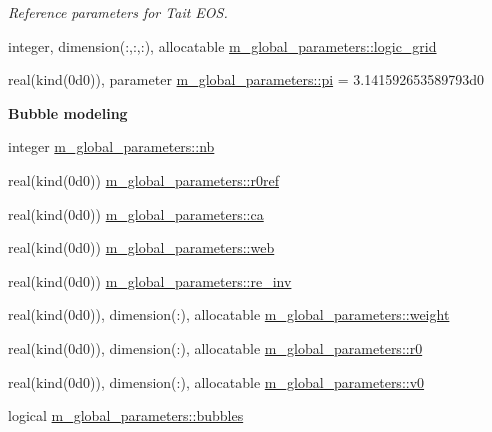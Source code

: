 \begin{DoxyCompactItemize}
\begin{DoxyCompactList}\small\item\em Reference parameters for Tait E\+OS. \end{DoxyCompactList}\item 
integer, dimension(\+:,\+:,\+:), allocatable \hyperlink{namespacem__global__parameters_adfaf902b37292b91750274e26989e8e6}{m\+\_\+global\+\_\+parameters\+::logic\+\_\+grid}
\item 
real(kind(0d0)), parameter \hyperlink{namespacem__global__parameters_a21765a90c01d221524670d1344b126cd}{m\+\_\+global\+\_\+parameters\+::pi} = 3.\+141592653589793d0
\end{DoxyCompactItemize}
\begin{Indent}\textbf{ Bubble modeling}\par
\begin{DoxyCompactItemize}
\item 
integer \hyperlink{namespacem__global__parameters_ad76c4758994b52559f478d251dc0cba5}{m\+\_\+global\+\_\+parameters\+::nb}
\item 
real(kind(0d0)) \hyperlink{namespacem__global__parameters_a24492f9b474683476a342e7ee42c1c6d}{m\+\_\+global\+\_\+parameters\+::r0ref}
\item 
real(kind(0d0)) \hyperlink{namespacem__global__parameters_a1fcd6cc13ad7f604ef81708716a1feac}{m\+\_\+global\+\_\+parameters\+::ca}
\item 
real(kind(0d0)) \hyperlink{namespacem__global__parameters_af2ed21959a90158c2459574230cdfcff}{m\+\_\+global\+\_\+parameters\+::web}
\item 
real(kind(0d0)) \hyperlink{namespacem__global__parameters_a4438313a11564fa911c586d2dee15b8d}{m\+\_\+global\+\_\+parameters\+::re\+\_\+inv}
\item 
real(kind(0d0)), dimension(\+:), allocatable \hyperlink{namespacem__global__parameters_a121ed97f0ae913d37bce5bbf1c7b2cc2}{m\+\_\+global\+\_\+parameters\+::weight}
\item 
real(kind(0d0)), dimension(\+:), allocatable \hyperlink{namespacem__global__parameters_a585a72037bbffe12e8d4512a57f52418}{m\+\_\+global\+\_\+parameters\+::r0}
\item 
real(kind(0d0)), dimension(\+:), allocatable \hyperlink{namespacem__global__parameters_a334b440356a4353d073c43e68c2372da}{m\+\_\+global\+\_\+parameters\+::v0}
\item 
logical \hyperlink{namespacem__global__parameters_a4a22ed160838f8fbe6bd506f334b8815}{m\+\_\+global\+\_\+parameters\+::bubbles}
\end{DoxyCompactItemize}
\end{Indent}

